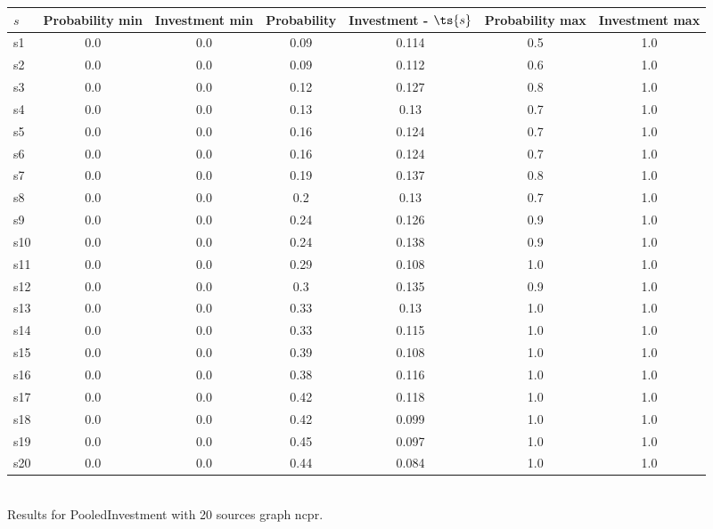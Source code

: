 \documentclass{article}
\begin{document}
\noindent\begin{tabular}{|l|c|c|c|c|c|c|}
\hline
$s$& Probability min & Investment min & Probability & Investment - $\ts{s}$ & Probability max & Investment max\\
\hline
s1 &0.0 & 0.0 & 0.09 & 0.114 & 0.5 & 1.0\\
\hline
s2 &0.0 & 0.0 & 0.09 & 0.112 & 0.6 & 1.0\\
\hline
s3 &0.0 & 0.0 & 0.12 & 0.127 & 0.8 & 1.0\\
\hline
s4 &0.0 & 0.0 & 0.13 & 0.13 & 0.7 & 1.0\\
\hline
s5 &0.0 & 0.0 & 0.16 & 0.124 & 0.7 & 1.0\\
\hline
s6 &0.0 & 0.0 & 0.16 & 0.124 & 0.7 & 1.0\\
\hline
s7 &0.0 & 0.0 & 0.19 & 0.137 & 0.8 & 1.0\\
\hline
s8 &0.0 & 0.0 & 0.2 & 0.13 & 0.7 & 1.0\\
\hline
s9 &0.0 & 0.0 & 0.24 & 0.126 & 0.9 & 1.0\\
\hline
s10 &0.0 & 0.0 & 0.24 & 0.138 & 0.9 & 1.0\\
\hline
s11 &0.0 & 0.0 & 0.29 & 0.108 & 1.0 & 1.0\\
\hline
s12 &0.0 & 0.0 & 0.3 & 0.135 & 0.9 & 1.0\\
\hline
s13 &0.0 & 0.0 & 0.33 & 0.13 & 1.0 & 1.0\\
\hline
s14 &0.0 & 0.0 & 0.33 & 0.115 & 1.0 & 1.0\\
\hline
s15 &0.0 & 0.0 & 0.39 & 0.108 & 1.0 & 1.0\\
\hline
s16 &0.0 & 0.0 & 0.38 & 0.116 & 1.0 & 1.0\\
\hline
s17 &0.0 & 0.0 & 0.42 & 0.118 & 1.0 & 1.0\\
\hline
s18 &0.0 & 0.0 & 0.42 & 0.099 & 1.0 & 1.0\\
\hline
s19 &0.0 & 0.0 & 0.45 & 0.097 & 1.0 & 1.0\\
\hline
s20 &0.0 & 0.0 & 0.44 & 0.084 & 1.0 & 1.0\\
\hline
\end{tabular}\\

\noindent Results for PooledInvestment with 20 sources graph ncpr.
\end{document}
